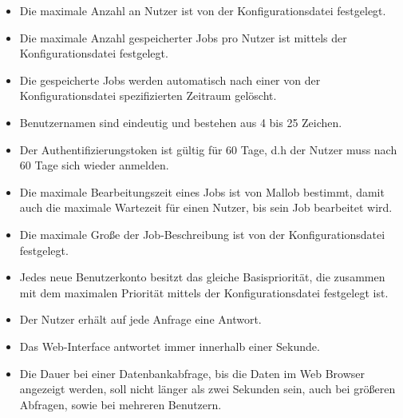 \begin{itemize}
    \item Die maximale Anzahl an Nutzer ist von der Konfigurationsdatei festgelegt. %
    \item Die maximale Anzahl gespeicherter Jobs pro Nutzer ist mittels der Konfigurationsdatei festgelegt. 
    \item Die gespeicherte Jobs werden automatisch nach einer von der Konfigurationsdatei spezifizierten Zeitraum gelöscht.
    \item Benutzernamen sind eindeutig und bestehen aus 4 bis 25 Zeichen.
    \item Der Authentifizierungstoken ist gültig für 60 Tage, d.h der Nutzer muss nach 60 Tage sich wieder anmelden. %
    \item Die maximale Bearbeitungszeit eines Jobs ist von Mallob bestimmt, damit auch die maximale Wartezeit für einen Nutzer, bis sein Job bearbeitet wird.
    \item Die maximale Große der Job-Beschreibung ist von der Konfigurationsdatei festgelegt.
    \item Jedes neue Benutzerkonto besitzt das gleiche Basispriorität, die zusammen mit dem maximalen Priorität mittels der Konfigurationsdatei festgelegt ist.
    \item Der Nutzer erhält auf jede Anfrage eine Antwort.
    \item Das Web-Interface antwortet immer innerhalb einer Sekunde. %
    \item Die Dauer bei einer Datenbankabfrage, bis die Daten im Web Browser angezeigt werden, soll nicht länger als zwei Sekunden sein, auch bei größeren Abfragen, sowie bei mehreren Benutzern.
    
\end{itemize}